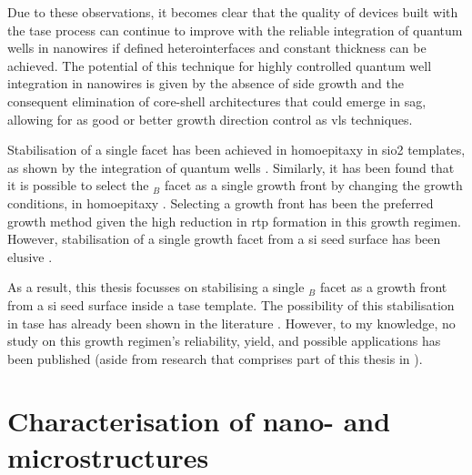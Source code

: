 Due to these observations, it becomes clear that the quality of devices built with the \acs{tase} process can continue to improve with the reliable integration of quantum wells in nanowires if defined heterointerfaces and constant thickness can be achieved. The potential of this technique for highly controlled quantum well integration in nanowires is given by the absence of side growth and the consequent elimination of core-shell architectures that could emerge in \acs{sag}, allowing for as good or better growth direction control as \acs{vls} techniques.

Stabilisation of a single  facet has been achieved in homoepitaxy in \acs{sio2} templates, as shown by the integration of quantum wells \cite{Brunelli2019}. Similarly, it has been found that it is possible to select the \(_B\) facet as a single growth front by changing the growth conditions, in homoepitaxy \cite{Goswami2020}. Selecting a  growth front has been the preferred growth method given the high reduction in \acs{rtp} formation in this growth regimen. However, stabilisation of a single  growth facet from a  \acl{si} seed surface has been elusive \cite{Knoedler2017}.

As a result, this thesis focusses on stabilising a single \(_B\) facet as a growth front from a  \acl{si} seed surface inside a \acs{tase} template. The possibility of this stabilisation in \acs{tase} has already been shown in the literature \cite{Ritter2021, Borg2015}. However, to my knowledge, no study on this growth regimen's reliability, yield, and possible applications has been published (aside from research that comprises part of this thesis in \cite{Brugnolotto2023, Brugnolotto2023_2}).



\section{Characterisation of nano- and microstructures}

